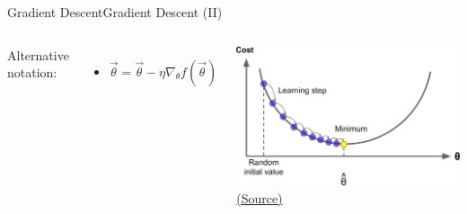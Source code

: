 \documentclass[10pt,compress]{beamer} %
\begin{document}
\begin{frame}{Gradient Descent}{Gradient Descent (II)}
	\begin{columns}[c]
		Alternative notation: 
		\begin{itemize}
		\item[] $\vec{\theta} = \vec{\theta} - \eta \nabla_{\theta} f(\vec{\theta})$
		\end{itemize}

		\centering
		\includegraphics[width=\linewidth]{figs/gradient_descent.png}\\
		\scriptsize \href{http://uc-r.github.io/gbm_regression}{(Source)}
	\end{columns}
\end{frame}
\end{document}
